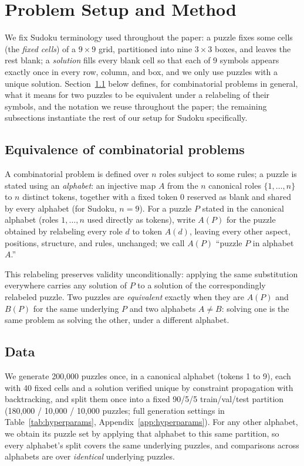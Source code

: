 \documentclass{article} %
\begin{document}
\section{Problem Setup and Method}
\label{sec:method}

We fix Sudoku terminology used throughout the paper: a
puzzle fixes some cells (the \emph{fixed cells}) of a $9\times9$ grid,
partitioned into nine $3\times3$ boxes, and leaves the rest blank; a
\emph{solution} fills every blank cell so that each of 9 symbols
appears exactly once in every row, column, and box, and we only use
puzzles with a unique solution. Section~\ref{sec:equivalence} below
defines, for combinatorial problems in general, what it means for two
puzzles to be equivalent under a relabeling of their symbols, and the
notation we reuse throughout the paper; the remaining subsections
instantiate the rest of our setup for Sudoku specifically.

\subsection{Equivalence of combinatorial problems}
\label{sec:equivalence}

A combinatorial problem is defined over $n$ roles
subject to some rules; a puzzle is stated using an
\emph{alphabet}: an injective map $A$ from the $n$ canonical roles
$\{1, \ldots, n\}$ to $n$ distinct tokens, together with a fixed token
$0$ reserved as blank and shared by every alphabet (for Sudoku,
$n=9$). For a puzzle $P$ stated in the canonical alphabet (roles
$1, \ldots, n$ used directly as tokens), write $A(P)$ for the puzzle
obtained by relabeling every role $d$ to token $A(d)$, leaving every
other aspect, positions, structure, and rules, unchanged; we call
$A(P)$ ``puzzle $P$ in alphabet $A$.''

This relabeling preserves validity unconditionally: applying the same
substitution everywhere carries any solution of $P$ to a solution of the
correspondingly relabeled puzzle. Two puzzles are \emph{equivalent}
exactly when they are $A(P)$ and $B(P)$ for the same underlying $P$ and
two alphabets $A \neq B$: solving one is the same problem as solving the
other, under a different alphabet.

\subsection{Data}

We generate 200{,}000 puzzles once, in a canonical alphabet (tokens 1 to
9), each with 40 fixed cells and a solution verified unique by
constraint propagation with backtracking, and split them once into a
fixed 90/5/5 train/val/test partition (180{,}000 / 10{,}000 / 10{,}000
puzzles; full generation settings in Table~\ref{tab:hyperparams},
Appendix~\ref{app:hyperparams}). For any other alphabet, we obtain its
puzzle set by applying
that alphabet to this same partition, so every alphabet's split covers
the same underlying puzzles, and comparisons across alphabets are over
\emph{identical} underlying puzzles.
\end{document}

